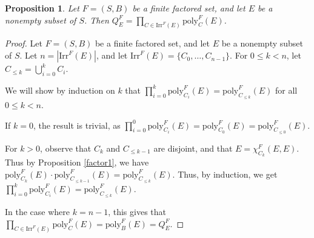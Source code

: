 \documentclass[authordate,onecolumn]{miri-tech-article}
\newtheorem{proposition}{Proposition}
\begin{document}
\begin{proposition}
Let $F=(S,B)$ be a finite factored set, and let $E$ be a nonempty subset of $S$. Then $Q^F_E=\prod_{C\in\text{Irr}^F(E)}\text{poly}^F_C(E)$.
\end{proposition}
\begin{proof}
Let $F=(S,B)$ be a finite factored set, and let $E$ be a nonempty subset of $S$. Let $n=|\text{Irr}^F(E)|$, and let $\text{Irr}^F(E)=\{C_0,\dots, C_{n-1}\}$. For $0\leq k<n$, let $C_{\leq k}=\bigcup_{i=0}^{k} C_i$.

We will show by induction on $k$ that $\prod_{i=0}^{k}\text{poly}^F_{C_i}(E)=\text{poly}^F_{C_{\leq k}}(E)$ for all $0\leq k<n$.

If $k=0$, the result is trivial, as $\prod_{i=0}^{0}\text{poly}^F_{C_i}(E)=\text{poly}^F_{C_{0}}(E)=\text{poly}^F_{C_{\leq 0}}(E)$.

For $k>0$, observe that $C_k$ and $C_{\leq k-1}$ are disjoint, and that $E=\chi^F_{C_k}(E,E)$. Thus by Proposition \ref{factor1}, we have $\text{poly}^F_{C_{ k}}(E)\cdot\text{poly}^F_{C_{\leq k-1}}(E)=\text{poly}^F_{C_{\leq k}}(E)$. Thus, by induction, we get $\prod_{i=0}^{k}\text{poly}^F_{C_i}(E)=\text{poly}^F_{C_{\leq k}}(E)$.

In the case where $k=n-1$, this gives that $\prod_{C\in\text{Irr}^F(E)}\text{poly}^F_C(E)=\text{poly}^F_{B}(E)=Q^F_E$.
\end{proof}
\end{document}
